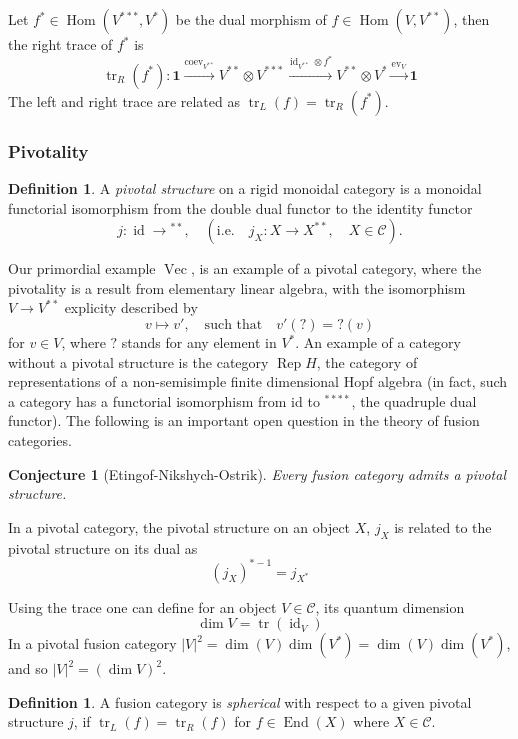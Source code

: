 \documentclass[11pt]{book}
\newtheorem{Conj}[theorem]{Conjecture}
\theoremstyle{Rem}
\theoremstyle{definition}
\newtheorem{Def}[theorem]{Definition}
\numberwithin{equation}{section}
\newcommand\tr{\operatorname{tr}}
\newcommand\End{\operatorname{End}}
\newcommand\id{\operatorname{id}}
\newcommand\Rep{\operatorname{Rep}}
\newcommand\Vect{\operatorname{Vec}}
\newcommand\Hom{\operatorname{Hom}}
\newcommand\C{\mathcal C}
\newcommand\one{\mathbf{1}}
\newcommand\ev{\operatorname{ev}}
\newcommand\coev{\operatorname{coev}}
\begin{document}
Let $f^* \in \Hom(V^{***}, V^*)$ be the dual morphism of $f\in \Hom(V, V^{**})$, then the right trace of $f^*$ is  \begin{equation}
	\tr_R(f^*): \one \overset{\coev_{V^{**}}}\longrightarrow V^{**}\otimes V^{***} \overset{ \id_{V^{**}} \otimes f^*}\longrightarrow V^{**} \otimes V^{*} \overset{\ev_{V}}\longrightarrow \one  
\end{equation}The left and right trace are related as $\tr_L(f) = \tr_R(f^*)$.

\subsubsection{Pivotality}
\begin{Def}
	A \textit{pivotal structure} on a rigid monoidal category is a monoidal functorial isomorphism from the double dual functor to the identity functor \begin{equation}
	j:  \id\rightarrow {}^{**} , \quad (\text{i.e.} \quad j_X :X\rightarrow X^{**}, \quad X\in \C ).
\end{equation}

\end{Def}Our primordial example $\Vect$, is an example of a pivotal category, where the pivotality is a result from elementary linear algebra, with the isomorphism $V\rightarrow V^{**}$ explicity described by \begin{equation}
	v\mapsto v' ,\quad  \text{such that} \quad v'(?) = ?(v)
\end{equation}  for $v\in V$, where $?$ stands for any element in $V^*$. An example of a category without a pivotal structure is the category $\Rep H$, the category of representations of a non-semisimple finite dimensional Hopf algebra (in fact, such a category has a functorial isomorphism from id to ${}^{****}$, the quadruple dual functor).
The following is an important open question in the theory of fusion categories. \begin{Conj}[Etingof-Nikshych-Ostrik]
Every fusion category admits a pivotal structure.
\end{Conj}
In a pivotal category, the pivotal structure on an object $X$, $j_X$ is related to the pivotal structure on its dual as \begin{equation}
	(j_X)^{*-1} = j_{X^*}
\end{equation} 

 Using the trace one can define for an object $V\in \C$, its quantum dimension \begin{equation}
	\dim V = \tr(\id_V)
\end{equation} 
In a pivotal fusion category $|V|^2 = \dim (V)\dim (V^*) = \dim (V)\dim (V^*)$, and so $|V|^2 = (\dim V)^2$. 
\begin{Def}
A fusion category is \textit{spherical} with respect to a given pivotal structure $j$, if $\tr_L(f) = \tr_R(f)$ for $f \in \End(X)$ where $X \in \C$.
\end{Def}
\end{document}
